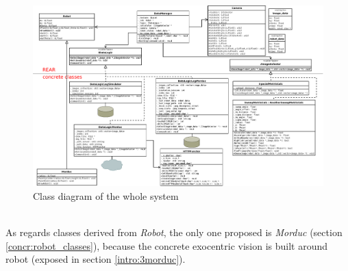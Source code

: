 {
\begin{figure}[!h]
  \begin{center}
    \includegraphics[width=\textheight, angle=270]{img/class_diagram.png} 
    \caption{Class diagram of the whole system}
    \label{fig:class_diagram_complete}
  \end{center}
\end{figure}
}
\\
As regards classes derived from \textit{Robot}, the only one proposed
is \textit{Morduc} (section \ref{concr:robot_classes}), because
the concrete \framework{} exocentric vision
is built around \morduc{} robot (exposed in section \ref{intro:3morduc}).

\clearpage

\clearpage

\clearpage

